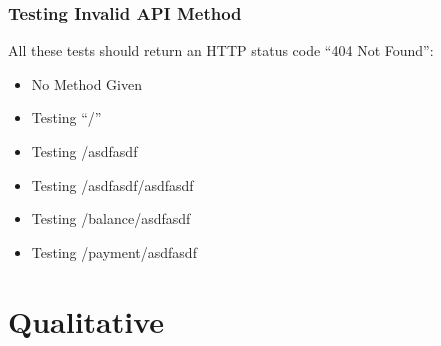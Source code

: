\subsubsection{Testing Invalid API Method}

All these tests should return an HTTP status code ``404 Not Found'':

\begin{itemize}
	\item No Method Given
	\item Testing ``/''
	\item Testing /asdfasdf
	\item Testing /asdfasdf/asdfasdf
	\item Testing /balance/asdfasdf
	\item Testing /payment/asdfasdf
\end{itemize}	

	
\section{Qualitative}